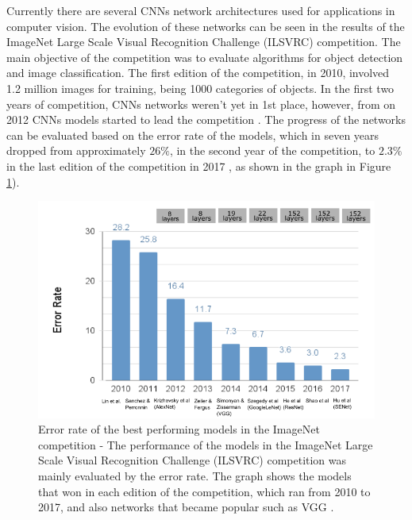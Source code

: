 Currently there are several CNNs network architectures used for applications in computer vision. The evolution of these networks can be seen in the results of the ImageNet Large Scale Visual Recognition Challenge (ILSVRC) competition. The main objective of the competition was to evaluate algorithms for object detection and image classification. The first edition of the competition, in 2010, involved 1.2 million images for training, being 1000 categories of objects. In the first two years of competition, CNNs networks weren't yet in 1st place, however, from on 2012 CNNs models started to lead the competition \cite{imagenet2020}. The progress of the networks can be evaluated based on the error rate of the models, which in seven years dropped from approximately $26\%$, in the second year of the competition, to $2.3\%$ in the last edition of the competition in 2017 \cite{johnson2019}, as shown in the graph in Figure \ref{fig:imagenet}).


\begin{figure}
    \centering
    \includegraphics[scale=0.4]{"Part 3 - Learning Systems/Supervised Learning/Deep Learning/images/figure127.png"}
    \caption{ Error rate of the best performing models in the ImageNet competition - The performance of the models in the ImageNet Large Scale Visual Recognition Challenge (ILSVRC) competition was mainly evaluated by the error rate. The graph shows the models that won in each edition of the competition, which ran from 2010 to 2017, and also networks that became popular such as VGG \cite{johnson2019}.}
    \label{fig:imagenet}
\end{figure}

